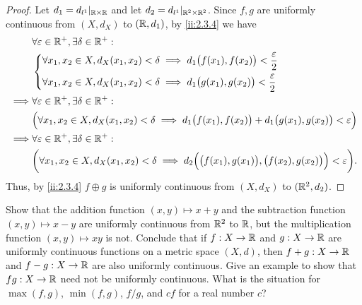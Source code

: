 \begin{proof}
  Let \(d_1 = d_{l^1}|_{\mathbb{R} \times \mathbb{R}}\) and let \(d_2 = d_{l^1}|_{\mathbb{R}^2 \times \mathbb{R}^2}\).
  Since \(f, g\) are uniformly continuous from \((X, d_X)\) to \((\mathbb{R}, d_1)\), by \cref{ii:2.3.4} we have
  \begin{align*}
             & \forall \varepsilon \in \mathbb{R}^+, \exists \delta \in \mathbb{R}^+ :                                                                                            \\
             & \begin{dcases}
                 \forall x_1, x_2 \in X, d_X(x_1, x_2) < \delta \implies d_1\big(f(x_1), f(x_2)\big) < \dfrac{\varepsilon}{2} \\
                 \forall x_1, x_2 \in X, d_X(x_1, x_2) < \delta \implies d_1\big(g(x_1), g(x_2)\big) < \dfrac{\varepsilon}{2}
               \end{dcases}                                       \\
    \implies & \forall \varepsilon \in \mathbb{R}^+, \exists \delta \in \mathbb{R}^+ :                                                                                            \\
             & \Big(\forall x_1, x_2 \in X, d_X(x_1, x_2) < \delta \implies d_1\big(f(x_1), f(x_2)\big) + d_1\big(g(x_1), g(x_2)\big) < \varepsilon\Big)          \\
    \implies & \forall \varepsilon \in \mathbb{R}^+, \exists \delta \in \mathbb{R}^+ :                                                                                            \\
             & \bigg(\forall x_1, x_2 \in X, d_X(x_1, x_2) < \delta \implies d_2\Big(\big(f(x_1), g(x_1)\big), \big(f(x_2), g(x_2)\big)\Big) < \varepsilon\bigg).
  \end{align*}
  Thus, by \cref{ii:2.3.4} \(f \oplus g\) is uniformly continuous from \((X, d_X)\) to \((\mathbb{R}^2, d_2)\).
\end{proof}

\begin{ex}\label{ii:ex:2.3.6}
  Show that the addition function \((x, y) \mapsto x + y\) and the subtraction function \((x, y) \mapsto x - y\) are uniformly continuous from \(\mathbb{R}^2\) to \(\mathbb{R}\), but the multiplication function \((x, y) \mapsto xy\) is not.
  Conclude that if \(f : X \to \mathbb{R}\) and \(g : X \to \mathbb{R}\) are uniformly continuous functions on a metric space \((X, d)\), then \(f + g : X \to \mathbb{R}\) and \(f - g : X \to \mathbb{R}\) are also uniformly continuous.
  Give an example to show that \(fg : X \to \mathbb{R}\) need not be uniformly continuous.
  What is the situation for \(\max(f, g)\), \(\min(f, g)\), \(f / g\), and \(cf\) for a real number \(c\)?
\end{ex}


